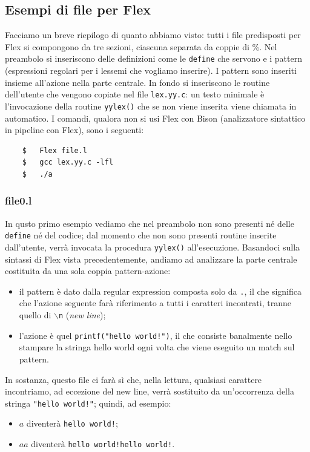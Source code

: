 \documentclass[class=book, crop=false, oneside, 12pt]{standalone}
\begin{document}
\subsection{Esempi di file per Flex}
Facciamo un breve riepilogo di quanto abbiamo visto: tutti i file predisposti per Flex si compongono da tre sezioni, ciascuna separata da coppie di \%. Nel preambolo si inseriscono delle definizioni come le \texttt{define} che servono e i pattern (espressioni regolari per i lessemi che vogliamo inserire). I pattern sono inseriti insieme all'azione nella parte centrale. In fondo si inseriscono le routine dell'utente che vengono copiate nel file \texttt{lex.yy.c}: un testo minimale è l'invocazione della routine \texttt{yylex()} che se non viene inserita viene chiamata in automatico. I comandi, qualora non si usi Flex con Bison (analizzatore sintattico in pipeline con Flex), sono i seguenti:
\begin{verbatim}
    $   Flex file.l
    $   gcc lex.yy.c -lfl
    $   ./a
\end{verbatim}

\subsubsection{file0.l}

In qusto primo esempio vediamo che nel preambolo non sono presenti né delle \texttt{define} né del codice; dal momento che non sono presenti routine inserite dall'utente, verrà invocata la procedura \texttt{yylex()} all'esecuzione. Basandoci sulla sintassi di Flex vista precedentemente, andiamo ad analizzare la parte centrale costituita da una sola coppia pattern-azione:
\begin{itemize}
    \item il pattern è dato dalla regular expression composta solo da \texttt{.}, il che significa che l'azione seguente farà riferimento a tutti i caratteri incontrati, tranne quello di \texttt{\(\backslash\)n} (\emph{new line});
    \item l'azione è quel \texttt{printf("hello world!")}, il che consiste banalmente nello stampare la stringa hello world ogni volta che viene eseguito un match sul pattern.
\end{itemize}
In sostanza, questo file ci farà sì che, nella lettura, qualsiasi carattere incontriamo, ad eccezione del new line, verrà sostituito da un'occorrenza della stringa \texttt{"hello world!"}; quindi, ad esempio:
\begin{itemize}
    \item \(a\) diventerà \texttt{hello world!};
    \item \(aa\) diventerà \texttt{hello world!hello world!}.
\end{itemize}
\end{document}
